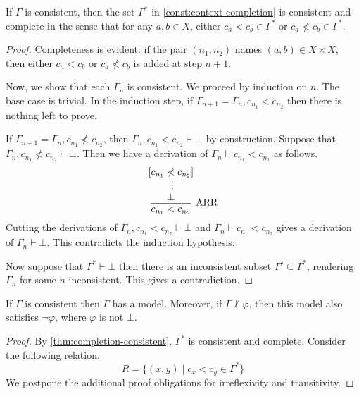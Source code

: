 \documentclass[a4paper]{article}
\begin{document}
\begin{enumerate}
  \begin{lemma}\label{thm:completion-consistent}
    If $\Gamma$ is consistent, then the set $\Gamma^*$ in \cref{const:context-completion} is consistent and complete in the sense that for any $a,b \in X$, either $c_{a} < c_{b} \in \Gamma^*$ or $c_{a} \nless c_{b} \in \Gamma^*$.
  \end{lemma}
  \begin{proof}
    Completeness is evident: if the pair $(n_1, n_2)$ names $(a,b) \in X \times X$, then either $c_a < c_b$ or $c_a \nless c_b$ is added at step $n + 1$.

    Now, we show that each $\Gamma_{n}$ is consistent.
    We proceed by induction on $n$.
    The base case is trivial.
    In the induction step, if $\Gamma_{n+1} = \Gamma_{n},c_{n_1} < c_{n_2}$ then there is nothing left to prove.

    If $\Gamma_{n+1} = \Gamma_{n},c_{n_1} \nless c_{n_2}$, then $\Gamma_{n},c_{n_1} < c_{n_2} \vdash \bot$ by construction.
    Suppose that $\Gamma_{n},c_{n_1} \nless c_{n_2} \vdash \bot$.
    Then we have a derivation of $\Gamma_{n} \vdash c_{n_1} < c_{n_2}$ as follows.
    \[
      \begin{prooftree}
        \hypo{[c_{n_1} \nless c_{n_2}]}
        \ellipsis{}{\bot}
        \infer1[ARR]{c_{n_1} < c_{n_2}}
      \end{prooftree}
    \]
    Cutting the derivations of $\Gamma_{n},c_{n_1} < c_{n_{2}} \vdash \bot$ and $\Gamma_{n} \vdash c_{n_1} < c_{n_{2}}$ gives a derivation of $\Gamma_{n} \vdash \bot$.
    This contradicts the induction hypothesis.
    
    Now suppose that $\Gamma^* \vdash \bot$ then there is an inconsistent subset $\Gamma' \subseteq \Gamma^*$, rendering $\Gamma_{n}$ for some $n$ inconsistent.
    This gives a contradiction.
  \end{proof}
  
  \begin{lemma}\label{thm:model-existence}
    If $\Gamma$ is consistent then $\Gamma$ has a model.
    Moreover, if $\Gamma \nvdash \varphi$, then this model also satisfies $\lnot\varphi$, where $\varphi$ is not $\bot$.
  \end{lemma}
  \begin{proof}
    By \cref{thm:completion-consistent}, $\Gamma^*$ is consistent and complete.
    Consider the following relation.
    \[
      R = \{(x,y) \mid c_{x} < c_{y} \in \Gamma^{*}\}
    \]
    We postpone the additional proof obligations for irreflexivity and transitivity.


\end{proof}
\end{enumerate}
\end{document}
